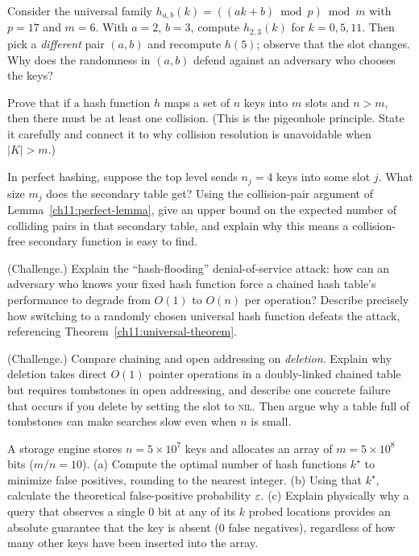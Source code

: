 \begin{exercise}
Consider the universal family $h_{a,b}(k) = ((ak+b)\bmod p)\bmod m$ with $p = 17$ and $m = 6$. With $a = 2$, $b = 3$, compute $h_{2,3}(k)$ for $k = 0, 5, 11$. Then pick a \emph{different} pair $(a,b)$ and recompute $h(5)$; observe that the slot changes. Why does the randomness in $(a,b)$ defend against an adversary who chooses the keys?
\end{exercise}

\begin{exercise}
Prove that if a hash function $h$ maps a set of $n$ keys into $m$ slots and $n > m$, then there must be at least one collision. (This is the pigeonhole principle. State it carefully and connect it to why collision resolution is unavoidable when $|K| > m$.)
\end{exercise}

\begin{exercise}
In perfect hashing, suppose the top level sends $n_j = 4$ keys into some slot $j$. What size $m_j$ does the secondary table get? Using the collision-pair argument of Lemma~\ref{ch11:perfect-lemma}, give an upper bound on the expected number of colliding pairs in that secondary table, and explain why this means a collision-free secondary function is easy to find.
\end{exercise}

\begin{exercise}
(Challenge.) Explain the ``hash-flooding'' denial-of-service attack: how can an adversary who knows your fixed hash function force a chained hash table's performance to degrade from $O(1)$ to $O(n)$ per operation? Describe precisely how switching to a randomly chosen universal hash function defeats the attack, referencing Theorem~\ref{ch11:universal-theorem}.
\end{exercise}

\begin{exercise}
(Challenge.) Compare chaining and open addressing on \emph{deletion}. Explain why deletion takes direct $O(1)$ pointer operations in a doubly-linked chained table but requires tombstones in open addressing, and describe one concrete failure that occurs if you delete by setting the slot to \textsc{nil}. Then argue why a table full of tombstones can make searches slow even when $n$ is small.
\end{exercise}

\begin{exercise}
A storage engine stores $n = 5 \times 10^7$ keys and allocates an array of $m = 5 \times 10^8$ bits ($m/n = 10$).
(a) Compute the optimal number of hash functions $k^\star$ to minimize false positives, rounding to the nearest integer.
(b) Using that $k^\star$, calculate the theoretical false-positive probability $\varepsilon$.
(c) Explain physically why a query that observes a single $0$ bit at any of its $k$ probed locations provides an absolute guarantee that the key is absent ($0$ false negatives), regardless of how many other keys have been inserted into the array.
\end{exercise}

